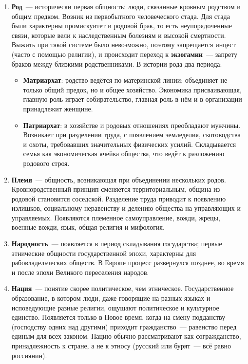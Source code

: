 \documentclass[12pt]{article}
\begin{document}
	\begin{enumerate}
		\item \textbf{Род}~--- исторически первая общность: люди, связанные кровным родством и общим предком. Возник из первобытного человеческого стада. Для стада были характерны промискуитет и родовой брак, то есть неупорядоченные связи, которые вели к наследственным болезням и высокой смертности. Выжить при такой системе было невозможно, поэтому запрещается инцест (часто с помощью религии), и происходит переход к \textbf{экзогамии}~--- запрету браков между близкими родственниками. В истории рода два периода:
		\begin{itemize}
			\item \textbf{Матриархат}: родство ведётся по материнской линии; объединяет не только общий предок, но и общее хозяйство. Экономика присваивающая, главную роль играет собирательство, главная роль в нём и в организации принадлежит женщине.
			\item \textbf{Патриархат}: в хозяйстве и родовых отношениях преобладают мужчины. Возникает при разделении труда, с появлением земледелия, скотоводства и охоты, требовавших значительных физических усилий. Складывается семья как экономическая ячейка общества, что ведёт к разложению родового строя.
		\end{itemize}
		\item \textbf{Племя}~--- общность, возникающая при объединении нескольких родов. Кровнородственный принцип сменяется территориальным, община из родовой становится соседской. Разделение труда приводит к появлению излишков, социальному неравенству и делению общества на управляющих и управляемых. Появляются племенное самоуправление, вожди, жрецы, военные вожди, язык, общая религия и мифология.
		\item \textbf{Народность}~--- появляется в период складывания государства; первые этнические общности государственной эпохи, характерны для рабовладельческих обществ. В Европе процесс развернулся позднее, во время и после эпохи Великого переселения народов.
		\item \textbf{Нация}~--- понятие скорее политическое, чем этническое. Государственное образование, в котором люди, даже говорящие на разных языках и исповедующие разные религии, ощущают политическое и культурное единство. Появляется только в Новое время, когда на смену подданству (господству одних над другими) приходит гражданство~--- равенство перед единым для всех законом. Нацию обычно рассматривают как согражданство, принадлежность к стране, а не к этносу (русский или бурят~--- всё равно россиянин).
	\end{enumerate}
\end{document}
